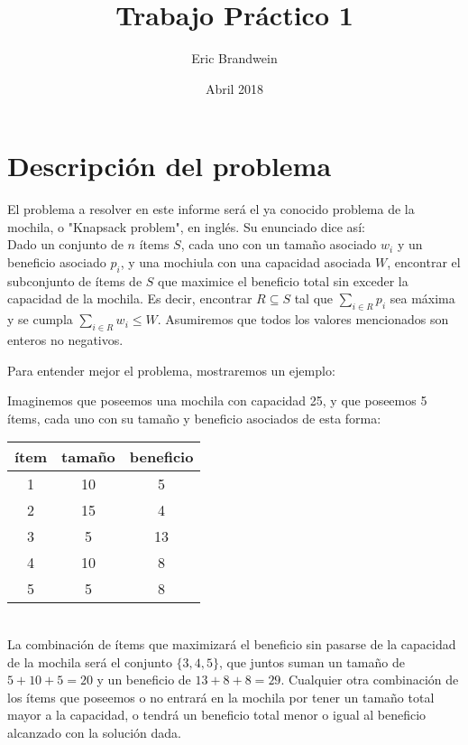 \documentclass[10pt, a4paper]{article}
\title{Trabajo Pr\'actico 1}
\author{Eric Brandwein}
\date{Abril 2018}
\begin{document}
\maketitle

\tableofcontents

\pagebreak


\section{Descripci\'on del problema}

El problema a resolver en este informe será el ya conocido problema de la mochila, o "Knapsack problem", en inglés. Su enunciado dice así: \\
Dado un conjunto de $n$ ítems $S$, cada uno con un tamaño asociado $w_i$ y un beneficio asociado $p_i$, y una mochiula con una capacidad asociada $W$, encontrar el subconjunto de ítems de $S$ que maximice el beneficio total sin exceder la capacidad de la mochila. Es decir, encontrar $R \subseteq S$ tal que $\sum_{i \in R} p_i$ sea máxima y se cumpla $\sum_{i \in R} w_i \leq W$. Asumiremos que todos los valores mencionados son enteros no negativos.\par

Para entender mejor el problema, mostraremos un ejemplo: \par
Imaginemos que poseemos una mochila con capacidad 25, y que poseemos 5 ítems, cada uno con su tamaño y beneficio asociados de esta forma: \\
\begin{tabular}{c|c|c}
	ítem & tamaño & beneficio \\ \hline
	1 & 10 & 5 \\
	2 & 15 & 4 \\
	3 & 5 & 13 \\
	4 & 10 & 8 \\
	5 & 5 & 8
\end{tabular} \\
La combinación de ítems que maximizará el beneficio sin pasarse de la capacidad de la mochila será el conjunto $\{3, 4, 5\}$, que juntos suman un tamaño de $5 + 10 + 5 = 20$ y un beneficio de $13 + 8 + 8 = 29$. Cualquier otra combinación de los ítems que poseemos o no entrará en la mochila por tener un tamaño total mayor a la capacidad, o tendrá un beneficio total menor o igual al beneficio alcanzado con la solución dada. \par
\end{document}
